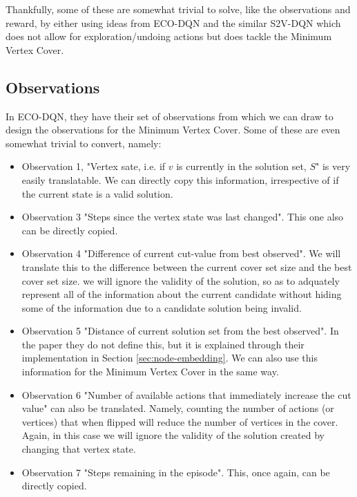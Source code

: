 \documentclass{article}
\begin{document}
Thankfully, some of these are somewhat trivial to solve, like the observations and reward, by either using ideas from ECO-DQN \cite{eco-dqn} and the similar S2V-DQN \cite{s2v-dqn} which does not allow for exploration/undoing actions but does tackle the Minimum Vertex Cover.

\subsection{Observations}\label{sec:observations-mvc}

In ECO-DQN, they have their set of observations from which we can draw to design the observations for the Minimum Vertex Cover. Some of these are even somewhat trivial to convert, namely:

\begin{itemize}
    \item Observation 1, "Vertex sate, i.e. if $v$ is currently in the solution set, $S$" is very easily translatable. We can directly copy this information, irrespective of if the current state is a valid solution.
    \item Observation 3 "Steps since the vertex state was last changed". This one also can be directly copied.
    \item Observation 4 "Difference of current cut-value from best observed". We will translate this to the difference between the current cover set size and the best cover set size. we will ignore the validity of the solution, so as to adquately represent all of the information about the current candidate without hiding some of the information due to a candidate solution being invalid.
    \item Observation 5 "Distance of current solution set from the best observed". In the paper they do not define this, but it is explained through their implementation in Section \ref{sec:node-embedding}. We can also use this information for the Minimum Vertex Cover in the same way.
    \item Observation 6 "Number of available actions that immediately increase the cut value" can also be translated. Namely, counting the number of actions (or vertices) that when flipped will reduce the number of vertices in the cover. Again, in this case we will ignore the validity of the solution created by changing that vertex state.
    \item Observation 7 "Steps remaining in the episode". This, once again, can be directly copied.
\end{itemize}
\end{document}
